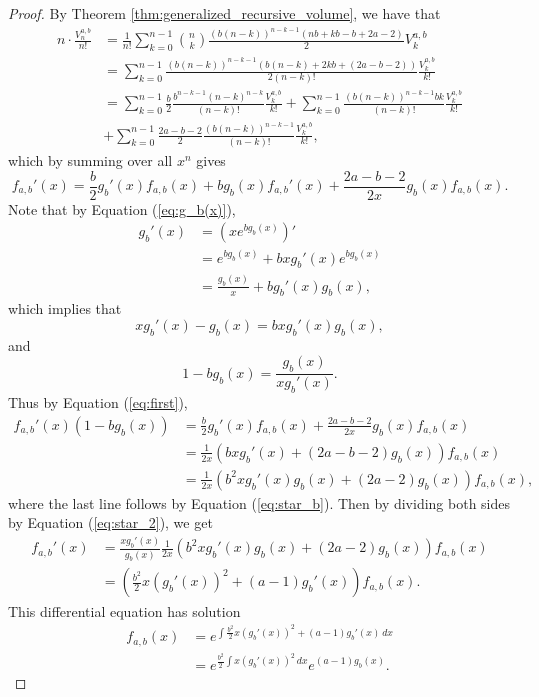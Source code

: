 \documentclass[11pt]{amsart}
\theoremstyle{definition}
\newcommand{\0}{\emptyset}
\begin{document}
\begin{proof}
By Theorem \ref{thm:generalized_recursive_volume}, we have that
\begin{align*}
    n \cdot \frac{V^{a,b}_n}{n!} &= \frac{1}{n!} \sum_{k=0}^{n-1} \binom{n}{k}\frac{(b(n-k))^{n-k-1}(nb+kb-b+2a-2)}{2} V^{a,b}_k\\
    &= \sum_{k=0}^{n-1} \frac{(b(n-k))^{n-k-1}(b(n-k) + 2kb + (2a-b-2))}{2(n-k)!}\frac{V^{a,b}_k}{k!}\\
    &= \sum_{k=0}^{n-1}\frac{b}{2} \frac{b^{n-k-1}(n-k)^{n-k}}{(n-k)!}\frac{V^{a,b}_k}{k!} +  \sum_{k=0}^{n-1}\frac{(b(n-k))^{n-k-1}bk}{(n-k)!}\frac{V^{a,b}_k}{k!}\\
    &+ \sum_{k=0}^{n-1}\frac{2a-b-2}{2} \frac{(b(n-k))^{n-k-1}}{(n-k)!}\frac{V^{a,b}_k}{k!},
\end{align*}
which by summing over all $x^n$ gives
\begin{equation}\label{eq:first}
    f_{a,b}'(x) = \frac{b}{2}g_b'(x)f_{a,b}(x) + bg_b(x)f_{a,b}'(x) + \frac{2a-b-2}{2x}g_b(x)f_{a,b}(x).
\end{equation}
Note that by Equation (\ref{eq:g_b(x)}),
\begin{align*}
    g_b'(x) &= (xe^{bg_b(x)})'\\
    &= e^{bg_b(x)} + bxg_b'(x)e^{bg_b(x)}\\
    &= \frac{g_b(x)}{x} + bg_b'(x)g_b(x),
\end{align*}
which implies that
\begin{equation}\label{eq:star_b}
    xg_b'(x) - g_b(x) = bxg_b'(x)g_b(x),
\end{equation}
and
\begin{equation}\label{eq:star_2}
    1 - bg_b(x) = \frac{g_b(x)}{xg_b'(x)}.
\end{equation}
Thus by Equation (\ref{eq:first}),
\begin{align*}
    f_{a,b}'(x)(1- bg_b(x)) &= \frac{b}{2}g_b'(x)f_{a,b}(x) + \frac{2a-b-2}{2x}g_b(x)f_{a,b}(x)\\
    &= \frac{1}{2x}(bxg_b'(x) + (2a-b-2)g_b(x))f_{a,b}(x)\\
    &= \frac{1}{2x}(b^2xg_b'(x)g_b(x) + (2a-2)g_b(x))f_{a,b}(x),
\end{align*}
where the last line follows by Equation (\ref{eq:star_b}). Then by dividing both sides by Equation (\ref{eq:star_2}), we get
\begin{align*}
    f_{a,b}'(x) &= \frac{xg_b'(x)}{g_b(x)}\frac{1}{2x}(b^2xg_b'(x)g_b(x) + (2a-2)g_b(x))f_{a,b}(x)\\
    &= \left( \frac{b^2}{2} x(g_b'(x))^2 + (a-1)g_b'(x) \right) f_{a,b}(x).
\end{align*}
This differential equation has solution
\begin{align*}
    f_{a,b}(x) &= e^{\int \frac{b^2}{2}x (g_b'(x))^2 + (a-1)g_b'(x)\, dx}\\
    &= e^{\frac{b^2}{2}\int x(g_b'(x))^2 \, dx}e^{(a-1)g_b(x)}.
\end{align*}
\end{proof}
\end{document}
